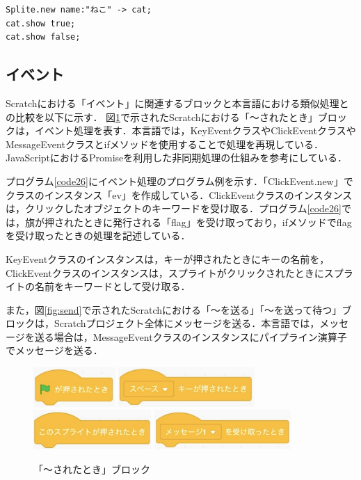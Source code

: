 \documentclass[10pt,a4j]{ltjsarticle}
\begin{document}
\begin{lstlisting}[caption=showメソッドのプログラム例, label=code25]
Splite.new name:"ねこ" -> cat;
cat.show true;
cat.show false;
\end{lstlisting}

\subsection{イベント}
Scratchにおける「イベント」に関連するブロックと本言語における類似処理との比較を以下に示す．
図\ref{fig:then}で示されたScratchにおける「〜されたとき」ブロックは，イベント処理を表す．本言語では，KeyEventクラスやClickEventクラスやMessageEventクラスとifメソッドを使用することで処理を再現している．JavaScriptにおけるPromiseを利用した非同期処理の仕組みを参考にしている．

プログラム\ref{code26}にイベント処理のプログラム例を示す．「ClickEvent.new」でクラスのインスタンス「ev」を作成している．ClickEventクラスのインスタンスは，クリックしたオブジェクトのキーワードを受け取る．プログラム\ref{code26}では，旗が押されたときに発行される「flag」を受け取っており，ifメソッドでflagを受け取ったときの処理を記述している．

KeyEventクラスのインスタンスは，キーが押されたときにキーの名前を，ClickEventクラスのインスタンスは，スプライトがクリックされたときにスプライトの名前をキーワードとして受け取る．

また，図\ref{fig:send}で示されたScratchにおける「〜を送る」「〜を送って待つ」ブロックは，Scratchプロジェクト全体にメッセージを送る．本言語では，メッセージを送る場合は，MessageEventクラスのインスタンスにパイプライン演算子でメッセージを送る．

\begin{figure}[H]
  \centering
  \includegraphics[height=15mm]{images/flag.pdf} 
  \includegraphics[height=15mm]{images/keypress.pdf} \\
  \includegraphics[height=15mm]{images/click.pdf} 
  \includegraphics[height=15mm]{images/message.pdf}
  \caption{「〜されたとき」ブロック}
  \label{fig:then}
\end{figure}
\end{document}
